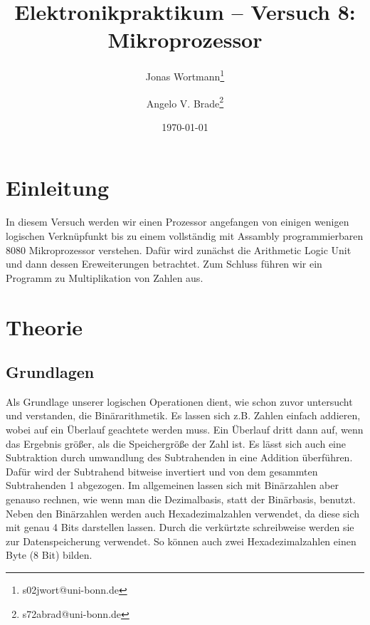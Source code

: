 \documentclass[10pt]{article}
\title{Elektronikpraktikum -- Versuch 8: Mikroprozessor}
\author[1]{Jonas Wortmann\thanks{s02jwort@uni-bonn.de}}
\author[1]{Angelo V. Brade\thanks{s72abrad@uni-bonn.de}}
\affil[1]{Rheinische Friedrich-Wilhelms-Universität Bonn}
\date{\today}
\begin{document}
\maketitle
\newpage

\tableofcontents
\newpage


\pagestyle{fancy}
\fancyhead[R]{\thepage}
\fancyhead[L]{\leftmark}


\begin{multicols}{2}
	\section{Einleitung}
	In diesem Versuch werden wir einen Prozessor angefangen von einigen wenigen logischen Verknüpfunkt bis zu einem vollständig mit Assambly programmierbaren 8080 Mikroprozessor verstehen. Dafür wird zunächst die Arithmetic Logic Unit und dann dessen Ereweiterungen betrachtet. Zum Schluss führen wir ein Programm zu Multiplikation von Zahlen aus.
	\section{Theorie}
	\subsection{Grundlagen}
	Als Grundlage unserer logischen Operationen dient, wie schon zuvor untersucht und verstanden, die Binärarithmetik. Es lassen sich z.B. Zahlen einfach addieren, wobei auf ein Überlauf geachtete werden muss. Ein Überlauf dritt dann auf, wenn das Ergebnis größer, als die Speichergröße der Zahl ist. Es lässt sich auch eine Subtraktion durch umwandlung des Subtrahenden in eine Addition überführen. Dafür wird der Subtrahend bitweise invertiert und von dem gesammten Subtrahenden 1 abgezogen. Im allgemeinen lassen sich mit Binärzahlen aber genauso rechnen, wie wenn man die Dezimalbasis, statt der Binärbasis, benutzt. Neben den Binärzahlen werden auch Hexadezimalzahlen verwendet, da diese sich mit genau 4 Bits darstellen lassen. Durch die verkürtzte schreibweise werden sie zur Datenspeicherung verwendet. So können auch zwei Hexadezimalzahlen einen Byte (8 Bit) bilden.

\end{multicols}
\end{document}

